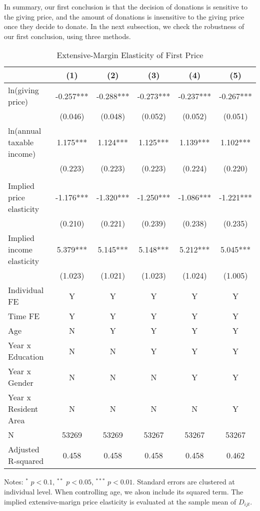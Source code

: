\documentclass[
  11pt,
  a4paper,
]{article}
\begin{document}
In summary, our first conclusion is that
the decision of donations is sensitive to the giving price,
and the amount of donations is insensitive to the giving price once they decide to donate.
In the next subsection, we check the robustness of our first conclusion, using three methods.

\begin{table}

\caption{\label{tab:MainExtensive}Extensive-Margin Elasticity of First Price}
\centering
\fontsize{7}{9}\selectfont
\begin{threeparttable}
\begin{tabular}[t]{lccccc}
\toprule
 & (1) & (2) & (3) & (4) & (5)\\
\midrule
ln(giving price) & -0.257*** & -0.288*** & -0.273*** & -0.237*** & -0.267***\\
 & (0.046) & (0.048) & (0.052) & (0.052) & (0.051)\\
ln(annual taxable income) & 1.175*** & 1.124*** & 1.125*** & 1.139*** & 1.102***\\
 & (0.223) & (0.223) & (0.223) & (0.224) & (0.220)\\
 &  &  &  &  & \\
Implied price elasticity & -1.176*** & -1.320*** & -1.250*** & -1.086*** & -1.221***\\
 & (0.210) & (0.221) & (0.239) & (0.238) & (0.235)\\
Implied income elasticity & 5.379*** & 5.145*** & 5.148*** & 5.212*** & 5.045***\\
 & (1.023) & (1.021) & (1.023) & (1.024) & (1.005)\\
Individual FE & Y & Y & Y & Y & Y\\
Time FE & Y & Y & Y & Y & Y\\
Age & N & Y & Y & Y & Y\\
Year x Education & N & N & Y & Y & Y\\
Year x Gender & N & N & N & Y & Y\\
Year x Resident Area & N & N & N & N & Y\\
N & 53269 & 53269 & 53267 & 53267 & 53267\\
Adjusted R-squared & 0.458 & 0.458 & 0.458 & 0.458 & 0.462\\
\bottomrule
\end{tabular}
\begin{tablenotes}
\item Notes: $^{*}$ $p < 0.1$, $^{**}$ $p < 0.05$, $^{***}$ $p < 0.01$. Standard errors are clustered at individual level. When controlling age, we alson include its squared term. The implied extensive-marign price elasticity is evaluated at the sample mean of $D_{ijt}$.
\end{tablenotes}
\end{threeparttable}
\end{table}
\end{document}

